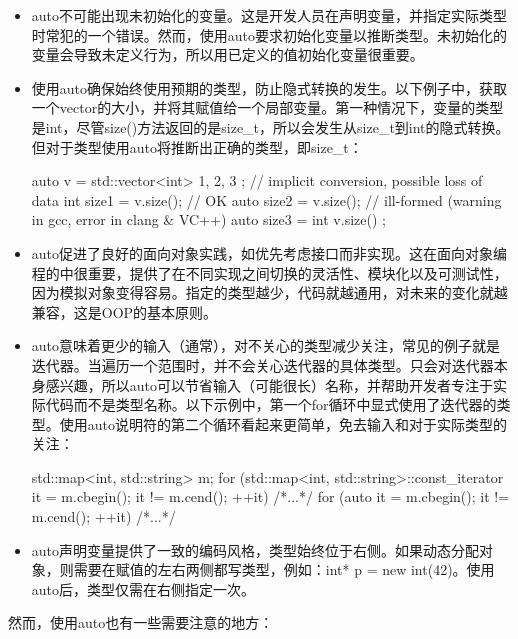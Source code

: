 \begin{itemize}
\item
auto不可能出现未初始化的变量。这是开发人员在声明变量，并指定实际类型时常犯的一个错误。然而，使用auto要求初始化变量以推断类型。未初始化的变量会导致未定义行为，所以用已定义的值初始化变量很重要。

\item
使用auto确保始终使用预期的类型，防止隐式转换的发生。以下例子中，获取一个vector的大小，并将其赋值给一个局部变量。第一种情况下，变量的类型是int，尽管size()方法返回的是size\_t，所以会发生从size\_t到int的隐式转换。但对于类型使用auto将推断出正确的类型，即size\_t：

\begin{cpp}
auto v = std::vector<int>{ 1, 2, 3 };
// implicit conversion, possible loss of data
int size1 = v.size();
// OK
auto size2 = v.size();
// ill-formed (warning in gcc, error in clang & VC++)
auto size3 = int{ v.size() };
\end{cpp}

\item
auto促进了良好的面向对象实践，如优先考虑接口而非实现。这在面向对象编程的中很重要，提供了在不同实现之间切换的灵活性、模块化以及可测试性，因为模拟对象变得容易。指定的类型越少，代码就越通用，对未来的变化就越兼容，这是OOP的基本原则。

\item
auto意味着更少的输入（通常），对不关心的类型减少关注，常见的例子就是迭代器。当遍历一个范围时，并不会关心迭代器的具体类型。只会对迭代器本身感兴趣，所以auto可以节省输入（可能很长）名称，并帮助开发者专注于实际代码而不是类型名称。以下示例中，第一个for循环中显式使用了迭代器的类型。使用auto说明符的第二个循环看起来更简单，免去输入和对于实际类型的关注：

\begin{cpp}
std::map<int, std::string> m;
for (std::map<int, std::string>::const_iterator
it = m.cbegin();
it != m.cend(); ++it)
{ /*...*/ }
for (auto it = m.cbegin(); it != m.cend(); ++it)
{ /*...*/ }
\end{cpp}

\item
auto声明变量提供了一致的编码风格，类型始终位于右侧。如果动态分配对象，则需要在赋值的左右两侧都写类型，例如：int* p = new int(42)。使用auto后，类型仅需在右侧指定一次。
\end{itemize}

然而，使用auto也有一些需要注意的地方：

